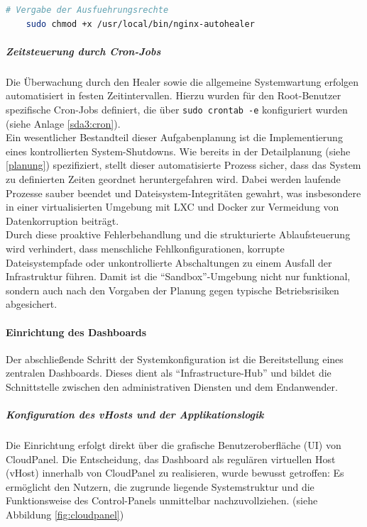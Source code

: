 \documentclass[11pt,
a4paper,
numbers=nonperiod,
footsepline,
oneside,
numbers=noenddot,
bibliography=totoc
]{scrartcl}
\begin{document}
\begin{lstlisting}[language=bash]
	# Vergabe der Ausfuehrungsrechte
	sudo chmod +x /usr/local/bin/nginx-autohealer
\end{lstlisting}

\subparagraph{Zeitsteuerung durch Cron-Jobs}
Die Überwachung durch den Healer sowie die allgemeine Systemwartung erfolgen automatisiert in festen Zeitintervallen. Hierzu wurden für den Root-Benutzer spezifische Cron-Jobs definiert, die über \texttt{sudo crontab -e} konfiguriert wurden (siehe Anlage \ref{sda3:cron}).\\

Ein wesentlicher Bestandteil dieser Aufgabenplanung ist die Implementierung eines kontrollierten System-Shutdowns. Wie bereits in der Detailplanung (siehe \ref{planung}) spezifiziert, stellt dieser automatisierte Prozess sicher, dass das System zu definierten Zeiten geordnet heruntergefahren wird. Dabei werden laufende Prozesse sauber beendet und Dateisystem-Integritäten gewahrt, was insbesondere in einer virtualisierten Umgebung mit LXC und Docker zur Vermeidung von Datenkorruption beiträgt.\\

Durch diese proaktive Fehlerbehandlung und die strukturierte Ablaufsteuerung wird verhindert, dass menschliche Fehlkonfigurationen, korrupte Dateisystempfade oder unkontrollierte Abschaltungen zu einem Ausfall der Infrastruktur führen. Damit ist die "`Sandbox"'-Umgebung nicht nur funktional, sondern auch nach den Vorgaben der Planung gegen typische Betriebsrisiken abgesichert.

\paragraph{Einrichtung des Dashboards}

Der abschließende Schritt der Systemkonfiguration ist die Bereitstellung eines zentralen Dashboards. Dieses dient als "`Infrastructure-Hub"' und bildet die Schnittstelle zwischen den administrativen Diensten und dem Endanwender.

\subparagraph{Konfiguration des vHosts und der Applikationslogik}
Die Einrichtung erfolgt direkt über die grafische Benutzeroberfläche (UI) von CloudPanel. Die Entscheidung, das Dashboard als regulären virtuellen Host (vHost) innerhalb von CloudPanel zu realisieren, wurde bewusst getroffen: Es ermöglicht den Nutzern, die zugrunde liegende Systemstruktur und die Funktionsweise des Control-Panels unmittelbar nachzuvollziehen. (siehe Abbildung \ref{fig:cloudpanel})\\
\end{document}
